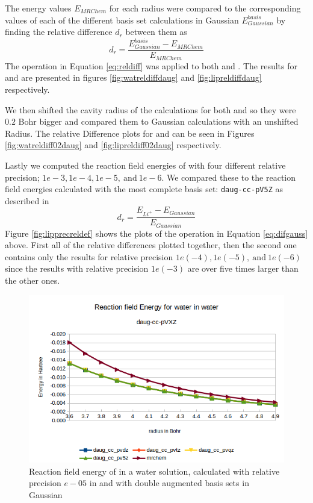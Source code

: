\documentclass[../master_thesis.tex]{subfiles}
\begin{document}
The \mrchem energy values $E_{MRChem}$ for each radius were compared to the
corresponding values of each of the different basis set calculations in
Gaussian  $E_{Gaussian}^{basis}$ by finding the relative difference $d_r$
between them as
\begin{equation}\label{eq:reldiff}
  d_r = \frac{E_{Gaussian}^{basis} - E_{MRChem}}{E_{MRChem}}
\end{equation}
The operation in Equation \ref{eq:reldiff} was applied to both  and .
The results for  and  are presented in figures \ref{fig:watreldiffdaug}
and \ref{fig:lipreldiffdaug} respectively.

We then shifted the cavity radius of the \mrchem calculations for both  and
 so they were $0.2$ Bohr bigger and compared them to Gaussian calculations
with an unshifted Radius. The relative Difference plots for  and  can be seen
in Figures \ref{fig:watreldiff02daug} and \ref{fig:lipreldiff02daug} respectively.

Lastly we computed the reaction field energies of  with four different
relative precision; $1e-3, 1e-4, 1e-5,\  \text{and}\  1e-6$. We compared these
to the reaction field energies calculated with the most complete basis set:
\verb!daug-cc-pV5Z! as described in
\begin{equation}\label{eq:difgauss}
  d_r = \frac{E_{Li^+} - E_{Gaussian}}{E_{Gaussian}}
\end{equation}
Figure \ref{fig:lipprecreldef} shows the plots of the operation in Equation \ref{eq:difgauss} above.
First all of the relative differences plotted together, then the second one contains
only the results for relative precision $1e(-4), 1e(-5),\  \text{and}\  1e(-6)$ since
the results with relative precision $1e(-3)$ are over five times larger than the other ones.

\begin{figure}[!htb]
  \centering
    \includegraphics[width=0.75\linewidth]{img/Erdaugwat.png}
  \caption[Reaction field energy of ]{Reaction field energy of  in a water solution, calculated with relative precision $e-05$ in \mrchem and with double augmented basis sets in Gaussian}
  \label{fig:watEnergyplotsdaug}
\end{figure}
\end{document}
